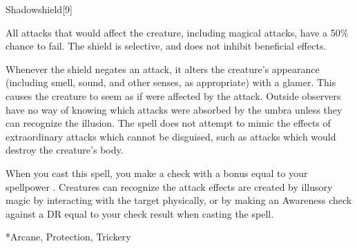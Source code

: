 \begin{spellsection}{Shadowshield}[9]
    \begin{spellheader}
    \end{spellheader}
    \begin{spellcontent}
        \begin{spelltargetinginfo}
        \end{spelltargetinginfo}
        \begin{spelleffects}
            \spelleffect All attacks that would affect the creature, including magical attacks, have a 50\% chance to fail. The shield is selective, and does not inhibit beneficial effects.

            Whenever the shield negates an attack, it alters the creature's appearance (including smell, sound, and other senses, as appropriate) with a glamer. This causes the creature to seem as if were affected by the attack. Outside observers have no way of knowing which attacks were absorbed by the umbra unless they can recognize the illusion. The spell does not attempt to mimic the effects of extraordinary attacks which cannot be disguised, such as attacks which would destroy the creature's body.

            When you cast this spell, you make a check with a bonus equal to your spellpower . Creatures can recognize the attack effects are created by illusory magic by interacting with the target physically, or by making an Awareness check against a DR equal to your check result when casting the spell.
            \spelldur \durshort
        \end{spelleffects}
    \end{spellcontent}
    \begin{spellfooter}
        *{Arcane, Protection, Trickery}
        \miscastrandom
    \end{spellfooter}
\end{spellsection}

